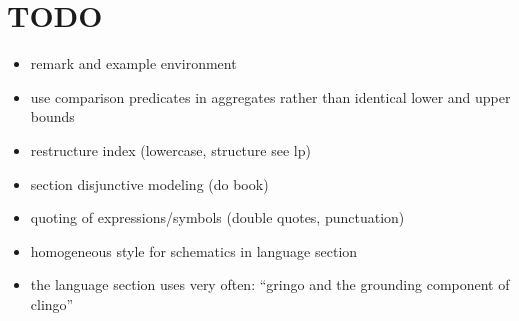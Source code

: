 \section{TODO}
\begin{itemize}
\item remark and example environment
\item use comparison predicates in aggregates rather than identical lower and upper bounds
\item restructure index (lowercase, structure see lp)
\item section disjunctive modeling (do book)
\item quoting of expressions/symbols (double quotes, punctuation)
\item homogeneous style for schematics in language section
\item the language section uses very often: ``gringo and the grounding component of clingo''
  
\end{itemize}

